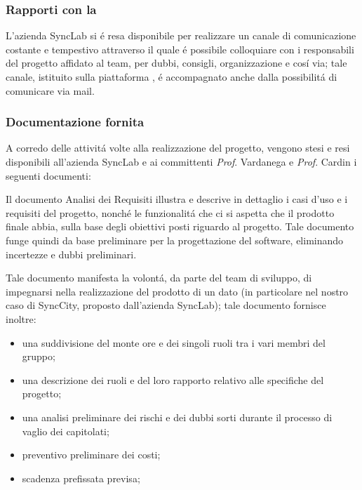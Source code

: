 \subsubsection{Rapporti con la }
L'azienda SyncLab si é resa disponibile per realizzare un canale di comunicazione costante e tempestivo attraverso il quale é possibile colloquiare con i responsabili del progetto affidato al team, per dubbi, consigli, organizzazione e cosí via; tale canale, istituito sulla piattaforma , é accompagnato anche dalla possibilitá di comunicare via mail.

\subsubsection{Documentazione fornita}
A corredo delle attivitá volte alla realizzazione del progetto, vengono stesi e resi disponibili all'azienda  SyncLab e ai committenti \textit{Prof}. Vardanega e \textit{Prof}. Cardin i seguenti documenti:

Il documento Analisi dei Requisiti illustra e descrive in dettaglio i casi d'uso e i requisiti del progetto, nonché le funzionalitá che ci si aspetta che il prodotto finale abbia, sulla base degli obiettivi posti riguardo al progetto. Tale documento funge quindi da base preliminare per la progettazione del software, eliminando incertezze e dubbi preliminari.

Tale documento manifesta la volontá, da parte del team di sviluppo, di impegnarsi nella realizzazione del prodotto di un dato  (in particolare nel nostro caso di SyncCity, proposto dall'azienda SyncLab); tale documento fornisce inoltre:

\begin{itemize}
    \item una suddivisione del monte ore e dei singoli ruoli tra i vari membri del gruppo;
    \item una descrizione dei ruoli e del loro rapporto relativo alle specifiche del progetto;
    \item una analisi preliminare dei rischi e dei dubbi sorti durante il processo di vaglio dei capitolati;
    \item preventivo preliminare dei costi;
    \item scadenza prefissata previsa;
\end{itemize}


